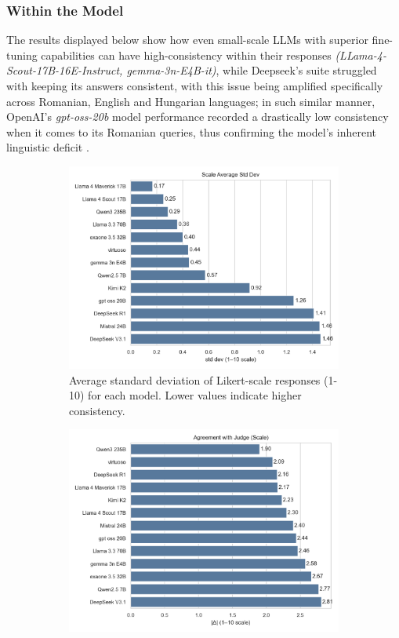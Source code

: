 \documentclass[11pt]{article}
\begin{document}
\subsubsection{Within the Model} 
The results displayed below show how even small-scale LLMs with superior fine-tuning capabilities can have high-consistency within their responses \textit{(LLama-4-Scout-17B-16E-Instruct, gemma-3n-E4B-it)}, while Deepseek's suite struggled with keeping its answers consistent, with this issue being amplified specifically across Romanian, English and Hungarian languages; in such similar manner, OpenAI's \textit{gpt-oss-20b} model performance recorded a drastically low consistency when it comes to its Romanian queries, thus confirming the model's inherent linguistic deficit \cite{walker2024}.
\begin{figure}[htbp]
    \centering
    \begin{subfigure}[b]{0.49\textwidth}
        \centering
        \includegraphics[width=\textwidth]{../analysis_reports/A4_model_scale_avg_std.png}
        \caption{Average standard deviation of Likert-scale responses (1-10) for each model. Lower values indicate higher consistency.}
        \label{fig:model_scale_avg_std}
    \end{subfigure}
    \hfill
    \begin{subfigure}[b]{0.49\textwidth}
        \centering
        \includegraphics[width=\textwidth]{../analysis_reports/F1_best_models_judge_agreement.png}

\end{subfigure}
\end{figure}
\end{document}
